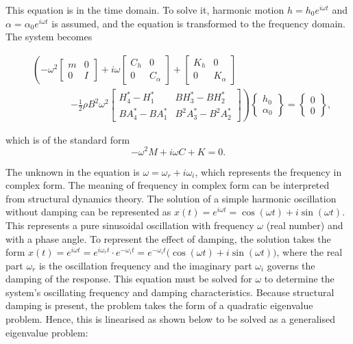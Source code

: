 \documentclass[../main]{subfiles}
\begin{document}
This equation is in the time domain. To solve it, harmonic motion \(h = h_0 e^{i\omega t}\) and \(\alpha = \alpha_0 e^{i\omega t}\) is assumed, 
and the equation is transformed to the frequency domain. The system becomes

\begin{equation}
\begin{aligned}
&\left(
-\omega^2\begin{bmatrix} m & 0 \\ 0 & I \end{bmatrix}
+ i\omega\begin{bmatrix} C_h & 0 \\ 0 & C_\alpha \end{bmatrix}
+ \begin{bmatrix} K_h & 0 \\ 0 & K_\alpha \end{bmatrix}
\right. \\
&\qquad\qquad
\left. - \frac{1}{2}\rho B^2 \omega^2
\begin{bmatrix} H_4^* - H_1^* & BH_3^* - BH_2^* \\
                BA_4^* - BA_1^* & B^2A_3^* - B^2A_2^* \end{bmatrix}
\right)
\begin{Bmatrix} h_0 \\ \alpha_0 \end{Bmatrix}
= \begin{Bmatrix} 0 \\ 0 \end{Bmatrix},
\end{aligned}
\end{equation}

which is of the standard form
\begin{equation}
    -\omega^2 M + i\omega C + K = 0.
\end{equation}

The unknown in the equation is \(\omega = \omega_r + i\omega_i\), which represents the frequency in complex form. The meaning of frequency in complex form can be interpreted from structural dynamics theory. 
The solution of a simple harmonic oscillation without damping can be represented as \(x(t) = e^{i\omega t} = \cos(\omega t) + i \sin(\omega t)\). 
This represents a pure sinusoidal oscillation with frequency \(\omega\) (real number) and with a phase angle. To represent the effect of damping, 
the solution takes the form \(x(t) = e^{i\omega t} = e^{i\omega_r t} \cdot e^{-\omega_i t} = e^{-\omega_i t} \bigl(\cos(\omega t) + i \sin(\omega t)\bigr)\),
where the real part \(\omega_r\) is the oscillation frequency and the imaginary part \(\omega_i\) governs the damping of the response.
This equation must be solved for \(\omega\) to determine the system's oscillating frequency and damping characteristics. 
Because structural damping is present, the problem takes the form of a quadratic eigenvalue problem. Hence, this is 
linearised as shown below to be solved as a generalised eigenvalue problem: \\
\end{document}
